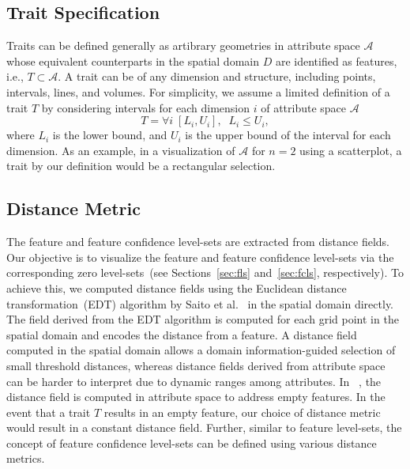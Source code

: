 \subsection{Trait Specification}
Traits can be defined generally as artibrary geometries in attribute space $\mathcal{A}$ whose equivalent counterparts in the spatial domain $D$ are identified as features, i.e., $T\subset\mathcal{A}$.
%
A trait can be of any dimension and structure, including points, intervals, lines, and volumes.
%
%
For simplicity, we assume a limited definition of a trait $T$ by considering intervals for each dimension $i$ of attribute space $\mathcal{A}$
%
\begin{equation}	
T = \forall{i}\;[L_{i}, U_{i}], \;\;L_{i} \leqslant U_{i}, 
\end{equation}
where $L_{i}$ is the lower bound, and $U_{i}$ is the upper bound of the interval for each dimension.
%
As an example, in a visualization of $\mathcal{A}$ for $n = 2$ using a scatterplot, a trait by our definition would be a rectangular selection.

\vspace{-1mm}
\subsection{Distance Metric}
%

The feature and feature confidence level-sets are extracted from distance fields.
%
Our objective is to visualize the feature and feature confidence level-sets via the corresponding zero level-sets~(see Sections~\ref{sec:fls} and~\ref{sec:fcls}, respectively). 
%
To achieve this, we computed distance fields using the Euclidean distance transformation~(EDT) algorithm by Saito et al.~\cite{saito1994new} in the spatial domain directly.
%
The field derived from the EDT algorithm is computed for each grid point in the spatial domain and encodes the distance from a feature.
%
A distance field computed in the spatial domain allows a domain information-guided selection of small threshold distances, whereas distance fields derived from attribute space can be harder to interpret due to dynamic ranges among attributes.
%
In ~\cite{jankowai2020feature}, the distance field is computed in attribute space to address empty features.
%
In the event that a trait $T$ results in an empty feature, our choice of distance metric would result in a constant distance field.
%
Further, similar to feature level-sets, the concept of feature confidence level-sets can be defined using various distance metrics.  
%

